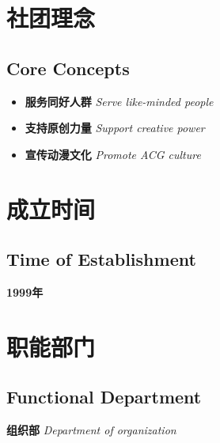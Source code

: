\documentclass[twoside,12pt]{book}
\begin{document}
\begin{flushleft}
    \begin{minipage}[t]{0.45\textwidth}
        \section*{\normalsize\textbf{\textcolor{truepurple}{社团理念}}}
        \vspace{-1em}
        \subsection*{\normalsize\textbf{\textcolor{thuorange}{Core Concepts}}}
        \vspace{-0em}
        \small
        \begin{itemize}
            \item \textbf{服务同好人群} \textit{Serve like-minded people}
            \item \textbf{支持原创力量} \textit{Support creative power}
            \item \textbf{宣传动漫文化} \textit{Promote ACG culture}
        \end{itemize}
        \vspace{0.7em}

        \section*{\normalsize\textbf{\textcolor{truepurple}{成立时间}}}
        \vspace{-1em}
        \subsection*{\normalsize\textbf{\textcolor{thuorange}{Time of Establishment}}}
        \vspace{-0.5em}
        
        \textbf{1999年}


        
    \end{minipage}
    \hfill
    \begin{minipage}[t]{0.5\textwidth}
        \section*{\normalsize\textbf{\textcolor{truepurple}{职能部门}}}
        \vspace{-1em}
        \subsection*{\normalsize\textbf{\textcolor{thuorange}{Functional Department}}}
        \vspace{-0em}
        \small
        \textbf{组织部} \textit{Department of organization}
        \vspace{0.4em}

\end{minipage}
\end{flushleft}
\end{document}
